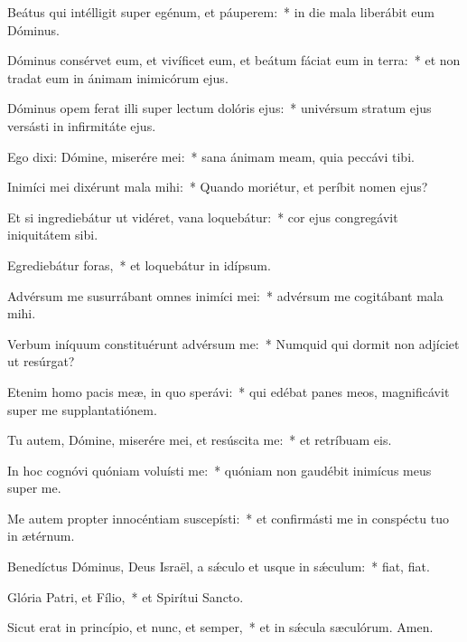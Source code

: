 \item Beátus qui intélligit super egénum, et páuperem:~* in die mala liberábit eum Dóminus.

\item Dóminus consérvet eum, et vivíficet eum, et beátum fáciat eum in terra:~* et non tradat eum in ánimam inimicórum ejus.

\item Dóminus opem ferat illi super lectum dolóris ejus:~* univérsum stratum ejus versásti in infirmitáte ejus.

\item Ego dixi: Dómine, miserére mei:~* sana ánimam meam, quia peccávi tibi.

\item Inimíci mei dixérunt mala mihi:~* Quando moriétur, et períbit nomen ejus?

\item Et si ingrediebátur ut vidéret, vana loquebátur:~* cor ejus congregávit iniquitátem sibi.

\item Egrediebátur foras,~* et loquebátur in idípsum.

\item Advérsum me susurrábant omnes inimíci mei:~* advérsum me cogitábant mala mihi.

\item Verbum iníquum constituérunt advérsum me:~* Numquid qui dormit non adjíciet ut resúrgat?

\item Etenim homo pacis meæ, in quo sperávi:~* qui edébat panes meos, magnificávit super me supplantatiónem.

\item Tu autem, Dómine, miserére mei, et resúscita me:~* et retríbuam eis.

\item In hoc cognóvi quóniam voluísti me:~* quóniam non gaudébit inimícus meus super me.

\item Me autem propter innocéntiam suscepísti:~* et confirmásti me in conspéctu tuo in ætérnum.

\item Benedíctus Dóminus, Deus Israël, a sǽculo et usque in sǽculum:~* fiat, fiat.

\item Glória Patri, et Fílio,~* et Spirítui Sancto.

\item Sicut erat in princípio, et nunc, et semper,~* et in sǽcula sæculórum. Amen.

